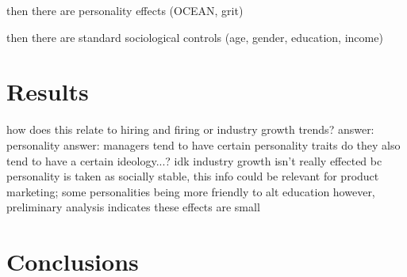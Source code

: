 \documentclass[review]{elsarticle}
\begin{document}
then there are personality effects (OCEAN, grit)

then there are standard sociological controls (age, gender, education, income)

\section{Results}

how does this relate to hiring and firing or industry growth trends?
answer: personality answer: managers tend to have certain personality traits
do they also tend to have a certain ideology...? idk
industry growth isn't really effected bc personality is taken as socially stable,
this info could be relevant for product marketing; some personalities being more friendly to alt education
however, preliminary analysis indicates these effects are small

\section{Conclusions}



\end{document}
